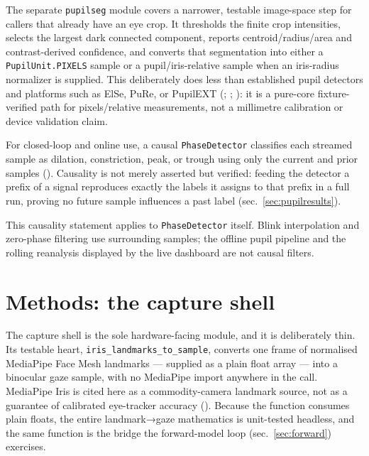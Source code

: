 \documentclass[
]{article}
\begin{document}
The separate \texttt{pupilseg} module covers a narrower, testable
image-space step for callers that already have an eye crop. It
thresholds the finite crop intensities, selects the largest dark
connected component, reports centroid/radius/area and contrast-derived
confidence, and converts that segmentation into either a
\texttt{PupilUnit.PIXELS} sample or a pupil/iris-relative sample when an
iris-radius normalizer is supplied. This deliberately does less than
established pupil detectors and platforms such as ElSe, PuRe, or
PupilEXT (;
;
): it is a pure-core
fixture-verified path for pixels/relative measurements, not a millimetre
calibration or device validation claim.

For closed-loop and online use, a causal \texttt{PhaseDetector}
classifies each streamed sample as dilation, constriction, peak, or
trough using only the current and prior samples
().
Causality is not merely asserted but verified: feeding the detector a
prefix of a signal reproduces exactly the labels it assigns to that
prefix in a full run, proving no future sample influences a past label
(sec.~\ref{sec:pupilresults}).

This causality statement applies to \texttt{PhaseDetector} itself. Blink
interpolation and zero-phase filtering use surrounding samples; the
offline pupil pipeline and the rolling reanalysis displayed by the live
dashboard are not causal filters.

\section{Methods: the capture shell}\label{sec:capture}

The capture shell is the sole hardware-facing module, and it is
deliberately thin. Its testable heart,
\texttt{iris\_landmarks\_to\_sample}, converts one frame of normalised
MediaPipe Face Mesh landmarks --- supplied as a plain float array ---
into a binocular gaze sample, with no MediaPipe import anywhere in the
call. MediaPipe Iris is cited here as a commodity-camera landmark
source, not as a guarantee of calibrated eye-tracker accuracy
(). Because
the function consumes plain floats, the entire landmark→gaze mathematics
is unit-tested headless, and the same function is the bridge the
forward-model loop (sec.~\ref{sec:forward}) exercises.
\end{document}

